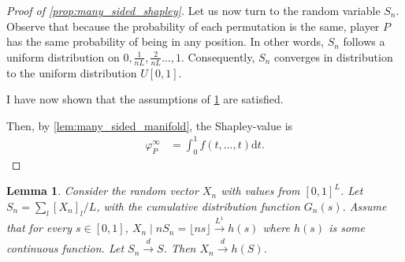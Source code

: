 \documentclass[a4paper]{article}
\newtheorem{lemma}{Lemma}
\newcommand{\dt}{\mathrm{d}t}
\newcommand{\Var}{\mathrm{Var}}
\begin{document}
\begin{proof}[Proof of \cref{prop:many_sided_shapley}]

    Let us now turn to the random variable $S_n$.
    Observe that because the probability of each permutation is the same, player $P$ has the same probability of being in any position.
    In other words, $S_n$ follows a uniform distribution on $0, \frac{1}{nL}, \frac{2}{nL} \dots, 1$.
    Consequently, $S_n$ converges in distribution to the uniform distribution $U[0, 1]$.

    I have now shown that the assumptions of \cref{lem:convergence_to_manifold} are satisfied.

    Then, by \cref{lem:many_sided_manifold}, the Shapley-value is
    \begin{align*}
        \varphi_P^\infty & = \int_0^1 f(t, \dots, t) \dt.
    \end{align*}

\end{proof}


\begin{lemma}
    \label{lem:convergence_to_manifold}
    Consider the random vector $X_n$ with values from $[0, 1]^L$.
    Let $S_n = \sum_l[X_n]_l / L$, with the cumulative distribution function $G_n(s)$.
    Assume that for every $s \in [0, 1]$, $X_n \mid n S_n = \lfloor ns \rfloor \xrightarrow[]{L^1} h(s)$ where $h(s)$ is some continuous function.
    Let $S_n \xrightarrow[]{d} S$.
    Then $X_n \xrightarrow[]{d} h(S)$.
\end{lemma}
\end{document}
